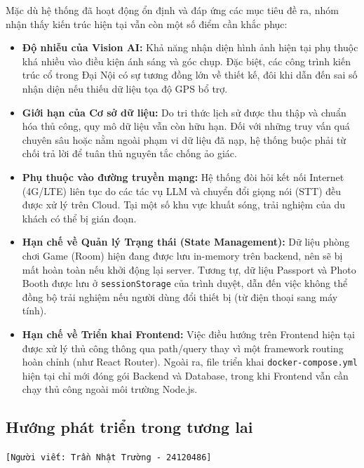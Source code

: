 Mặc dù hệ thống đã hoạt động ổn định và đáp ứng các mục tiêu đề ra, nhóm nhận thấy kiến trúc hiện tại vẫn còn một số điểm cần khắc phục:
\begin{itemize}
    \item \textbf{Độ nhiễu của Vision AI:} Khả năng nhận diện hình ảnh hiện tại phụ thuộc khá nhiều vào điều kiện ánh sáng và góc chụp. Đặc biệt, các công trình kiến trúc cổ trong Đại Nội có sự tương đồng lớn về thiết kế, đôi khi dẫn đến sai số nhận diện nếu thiếu dữ liệu tọa độ GPS bổ trợ.
    \item \textbf{Giới hạn của Cơ sở dữ liệu:} Do tri thức lịch sử được thu thập và chuẩn hóa thủ công, quy mô dữ liệu vẫn còn hữu hạn. Đối với những truy vấn quá chuyên sâu hoặc nằm ngoài phạm vi dữ liệu đã nạp, hệ thống buộc phải từ chối trả lời để tuân thủ nguyên tắc chống ảo giác.
    \item \textbf{Phụ thuộc vào đường truyền mạng:} Hệ thống đòi hỏi kết nối Internet (4G/LTE) liên tục do các tác vụ LLM và chuyển đổi giọng nói (STT) đều được xử lý trên Cloud. Tại một số khu vực khuất sóng, trải nghiệm của du khách có thể bị gián đoạn.
    \item \textbf{Hạn chế về Quản lý Trạng thái (State Management):} Dữ liệu phòng chơi Game (Room) hiện đang được lưu in-memory trên backend, nên sẽ bị mất hoàn toàn nếu khởi động lại server. Tương tự, dữ liệu Passport và Photo Booth được lưu ở \texttt{sessionStorage} của trình duyệt, dẫn đến việc không thể đồng bộ trải nghiệm nếu người dùng đổi thiết bị (từ điện thoại sang máy tính).
    \item \textbf{Hạn chế về Triển khai Frontend:} Việc điều hướng trên Frontend hiện tại được xử lý thủ công thông qua path/query thay vì một framework routing hoàn chỉnh (như React Router). Ngoài ra, file triển khai \texttt{docker-compose.yml} hiện tại chỉ mới đóng gói Backend và Database, trong khi Frontend vẫn cần chạy thủ công ngoài môi trường Node.js.
\end{itemize}

\subsection{Hướng phát triển trong tương lai}
\texttt{[Người viết: Trần Nhật Trường - 24120486]}

